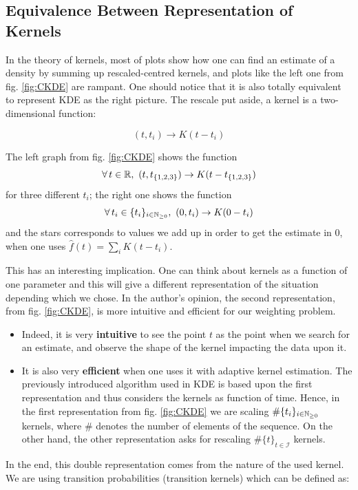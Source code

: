 \documentclass[11pt]{book}
\newcommand{\sequence}[1]{\{ #1 \}_{ i \in \N} }
\newcommand{\sequencetime}{\{t\}_{t \in \mathcal I} }
\begin{document}
\subsection{Equivalence Between Representation of Kernels}
\label{section:equivalence_bi_rep}

In the theory of kernels, most of plots show how one can find an estimate of a density by summing up rescaled-centred kernels, and plots like the left one from fig. \ref{fig:CKDE} are rampant. One should notice that it is also totally equivalent to represent KDE as the right picture. The rescale put aside, a kernel is a two-dimensional function: 

\begin{equation*}
(t,t_i) \to K(t - t_i) 
\end{equation*}

The left graph from fig. \ref{fig:CKDE} shows the function 
$$ \forall t \in \R, \ (t,t_{ \{1,2,3 \} }) \to K(t- t_{ \{1,2,3 \} }) $$ 
for three different $t_i$; the right one shows the function
$$ \forall t_i \in \sequence{ t_i }, \ (0,t_i ) \to K(0 - t_i) $$ 
and the stars corresponds to values we add up in order to get the estimate in $0$, when one uses $\hat{f}(t) = \sum_i K(t-t_i)$. 

This has an interesting implication. One can think about kernels as a function of one parameter and this will give a different representation of the situation depending which we chose. In the author's opinion, the second representation, from fig. \ref{fig:CKDE}, is more intuitive and efficient for our weighting problem. 

\begin{itemize}
\item Indeed, it is very \textbf{intuitive} to see the point $t$ as the point when we search for an estimate, and observe the shape of the kernel impacting the data upon it. 
\item It is also very \textbf{efficient} when one uses it with adaptive kernel estimation. The previously introduced algorithm used in KDE is based upon the first representation and thus considers the kernels as function of time. Hence, in the first representation from fig. \ref{fig:CKDE} we are scaling $\# \sequence{t_i}$ kernels, where $\#$ denotes the number of elements of the sequence. On the other hand, the other representation asks for rescaling $\#\sequencetime$ kernels. 
\end{itemize}


In the end, this double representation comes from the nature of the used kernel. We are using transition probabilities (transition kernels) which can be defined as:
\end{document}
